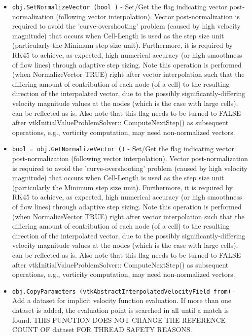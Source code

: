 \begin{itemize}
\item  \verb|obj.SetNormalizeVector (bool )| -  Set/Get the flag indicating vector post-normalization (following vector
 interpolation). Vector post-normalization is required to avoid the 
 'curve-overshooting' problem (caused by high velocity magnitude) that
 occurs when Cell-Length is used as the step size unit (particularly the
 Minimum step size unit). Furthermore, it is required by RK45 to achieve,
 as expected, high numerical accuracy (or high smoothness of flow lines)
 through adaptive step sizing. Note this operation is performed (when
 NormalizeVector TRUE) right after vector interpolation such that the
 differing amount of contribution of each node (of a cell) to the
 resulting direction of the interpolated vector, due to the possibly
 significantly-differing velocity magnitude values at the nodes (which is
 the case with large cells), can be reflected as is. Also note that this
 flag needs to be turned to FALSE after vtkInitialValueProblemSolver::
 ComputeNextStep() as subsequent operations, e.g., vorticity computation, 
 may need non-normalized vectors.

\item  \verb|bool = obj.GetNormalizeVector ()| -  Set/Get the flag indicating vector post-normalization (following vector
 interpolation). Vector post-normalization is required to avoid the 
 'curve-overshooting' problem (caused by high velocity magnitude) that
 occurs when Cell-Length is used as the step size unit (particularly the
 Minimum step size unit). Furthermore, it is required by RK45 to achieve,
 as expected, high numerical accuracy (or high smoothness of flow lines)
 through adaptive step sizing. Note this operation is performed (when
 NormalizeVector TRUE) right after vector interpolation such that the
 differing amount of contribution of each node (of a cell) to the
 resulting direction of the interpolated vector, due to the possibly
 significantly-differing velocity magnitude values at the nodes (which is
 the case with large cells), can be reflected as is. Also note that this
 flag needs to be turned to FALSE after vtkInitialValueProblemSolver::
 ComputeNextStep() as subsequent operations, e.g., vorticity computation, 
 may need non-normalized vectors.

\item  \verb|obj.CopyParameters (vtkAbstractInterpolatedVelocityField from)| -  Add a dataset for implicit velocity function evaluation. If more than 
 one dataset is added, the evaluation point is searched in all until a
 match is found. THIS FUNCTION DOES NOT CHANGE THE REFERENCE COUNT OF 
 dataset FOR THREAD SAFETY REASONS.


\end{itemize}
